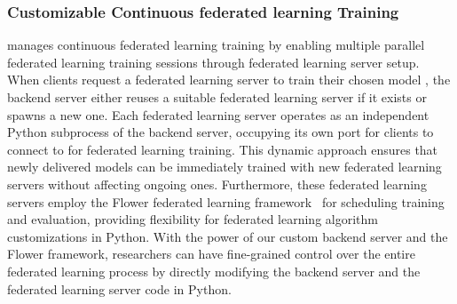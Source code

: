 \subsubsection{Customizable Continuous federated learning Training}
\fedkit manages continuous federated learning training by enabling multiple
parallel federated learning training sessions through federated learning server
setup.
When clients request a federated learning server to train their chosen model
\model{},
the backend server either reuses a suitable federated learning server \fs{}
if it exists or spawns a new one.
Each federated learning server operates as an independent Python subprocess of
the backend server,
occupying its own port for clients to connect to for federated learning
training.
This dynamic approach ensures that newly delivered models can be immediately
trained with new federated learning servers without affecting ongoing ones.
Furthermore,
these federated learning servers employ the Flower federated learning
framework~\cite{beutel2020flower} for scheduling training and evaluation,
providing flexibility for federated learning algorithm customizations in Python.
With the power of our custom backend server and the Flower framework,
researchers can have fine-grained control over the entire federated learning
process by directly modifying the backend server and the federated learning
server code in Python.
